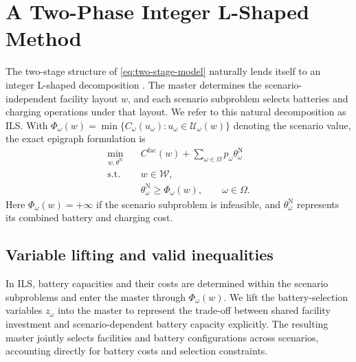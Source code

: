 \FloatBarrier
\section{A Two-Phase Integer L-Shaped Method}
\label{sec:method}

The two-stage structure of \eqref{eq:two-stage-model} naturally lends itself to an integer L-shaped decomposition \citep{laporte_integer_1993}.
The master determines the scenario-independent facility layout $w$, and each scenario subproblem selects batteries and charging operations under that layout.
We refer to this natural decomposition as ILS.
With $\Phi_\omega(w)=\min\{C_\omega(u_\omega):u_\omega\in\mathcal U_\omega(w)\}$ denoting the scenario value, the exact epigraph formulation is
\begin{equation}
\begin{aligned}
 \min_{w,\theta^{\mathrm N}}\quad
 &C^{\mathrm{fac}}(w)+\sum_{\omega\in\Omega}p_\omega\theta_\omega^{\mathrm N}\\
 \mathrm{s.t.}\quad
 &w\in\mathcal W,\\
 &\theta_\omega^{\mathrm N}\ge\Phi_\omega(w),\qquad\omega\in\Omega.
\end{aligned}
\label{eq:natural-ils-value-master}
\end{equation}
Here $\Phi_\omega(w)=+\infty$ if the scenario subproblem is infeasible, and $\theta_\omega^{\mathrm N}$ represents its combined battery and charging cost.

\subsection{Variable lifting and valid inequalities}
\label{subsec:lifted-reformulation}

In ILS, battery capacities and their costs are determined within the scenario subproblems and enter the master through $\Phi_\omega(w)$.
We lift the battery-selection variables $z_\omega$ into the master to represent the trade-off between shared facility investment and scenario-dependent battery capacity explicitly.
The resulting master jointly selects facilities and battery configurations across scenarios, accounting directly for battery costs and selection constraints.

